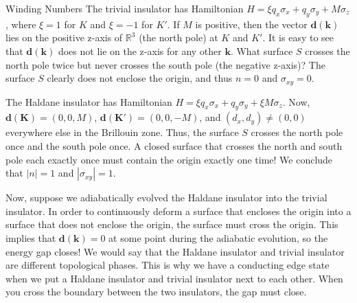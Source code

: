 \documentclass[a4paper,12pt]{article}
\renewcommand{\vec}[1]{\boldsymbol{\mathbf{#1}}}
\begin{document}
\begin{section}{Winding Numbers}
The trivial insulator has Hamiltonian $H=\xi q_x \sigma_x + q_y \sigma_y + M \sigma_z$, where $\xi=1$ for $K$ and $\xi=-1$ for $K'$.  If $M$ is positive, then the vector $\vec{d}(\vec{k})$ lies on the positive z-axis of $\mathbb{R}^3$ (the north pole) at $K$ and $K'$.  It is easy to see that $\vec{d}(\vec{k})$ does not lie on the z-axis for any other $\vec{k}$.  What surface $S$ crosses the north pole twice but never crosses the south pole (the negative z-axis)?  The surface $S$ clearly does not enclose the origin, and thus $n=0$ and $\sigma_{xy}=0$.

The Haldane insulator has Hamiltonian $H=\xi q_x \sigma_x + q_y \sigma_y + \xi M \sigma_z$.  Now, $\vec{d}(\vec{K})=(0,0,M)$, $\vec{d}(\vec{K'})=(0,0,-M)$, and $(d_x, d_y) \ne (0,0)$ everywhere else in the Brillouin zone.  Thus, the surface $S$ crosses the north pole once and the south pole once.  A closed surface that crosses the north and south pole each exactly once must contain the origin exactly one time!  We conclude that $|n|=1$ and $|\sigma_{xy}|=1$.

Now, suppose we adiabatically evolved the Haldane insulator into the trivial insulator.  
In order to continuously deform a surface that encloses the origin into a surface that does not enclose the origin, the surface must cross the origin.  This implies that $\vec{d}(\vec{k})=0$ at some point during the adiabatic evolution, so the energy gap closes!  We would say that the Haldane insulator and trivial insulator are different topological phases.  This is why we have a conducting edge state when we put a Haldane insulator and trivial insulator next to each other.  When you cross the boundary between the two insulators, the gap must close.

\end{section}
\end{document}
